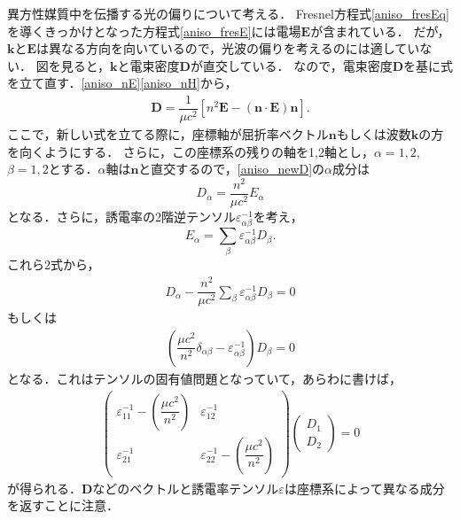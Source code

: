 異方性媒質中を伝播する光の偏りについて考える．
Fresnel方程式\eqref{aniso_fresEq}を導くきっかけとなった方程式\eqref{aniso_fresE}には電場$\boldsymbol{E}$が含まれている．
だが，$\boldsymbol{k}$と$\boldsymbol{E}$は異なる方向を向いているので，光波の偏りを考えるのには適していない．
図を見ると，$\boldsymbol{k}$と電束密度$\boldsymbol{D}$が直交している．
なので，電束密度$\boldsymbol{D}$を基に式を立て直す．\eqref{aniso_nE}\eqref{aniso_nH}から，
\begin{align}
  \boldsymbol{D}=\dfrac{1}{\mu{c}^2}\left[n^2\boldsymbol{E}-(\boldsymbol{n}\cdot\boldsymbol{E})\boldsymbol{n}\right].\label{aniso_newD}
\end{align}
ここで，新しい式を立てる際に，座標軸が屈折率ベクトル$\boldsymbol{n}$もしくは波数$\boldsymbol{k}$の方を向くようにする．
さらに，この座標系の残りの軸を1,2軸とし，$\alpha=1,2$, $\beta=1,2$とする．$\alpha$軸は$\boldsymbol{n}$と直交するので，\eqref{aniso_newD}の$\alpha$成分は
\[D_\alpha=\dfrac{n^2}{\mu{}c^2}E_\alpha\]
となる．さらに，誘電率の2階逆テンソル$\varepsilon_{\alpha\beta}^{-1}$を考え，
\[E_\alpha=\sum_{\beta}\varepsilon_{\alpha\beta}^{-1}D_\beta.\]
これら2式から，
\begin{align}
  D_\alpha-\dfrac{n^2}{\mu{}c^2}\sum_\beta\varepsilon_{\alpha\beta}^{-1}D_\beta=0
\end{align}
もしくは
\begin{align}
  \left(\dfrac{\mu{}c^2}{n^2}\delta_{\alpha\beta}-\varepsilon_{\alpha\beta}^{-1}\right)D_\beta=0
\end{align}
となる．これはテンソルの固有値問題となっていて，あらわに書けば，
\begin{align}
  \begin{pmatrix}
    \varepsilon^{-1}_{11}-\left(\dfrac{\mu{c^2}}{n^2}\right) & \varepsilon^{-1}_{12}\\
    \varepsilon^{-1}_{21} & \varepsilon^{-1}_{22}-\left(\dfrac{\mu{c^2}}{n^2}\right)
  \end{pmatrix}
  \begin{pmatrix}
    D_1\\
    D_2
  \end{pmatrix}
  =0\label{aniso_newDeq}
\end{align}
が得られる．$\boldsymbol{D}$などのベクトルと誘電率テンソル$\varepsilon$は座標系によって異なる成分を返すことに注意．

